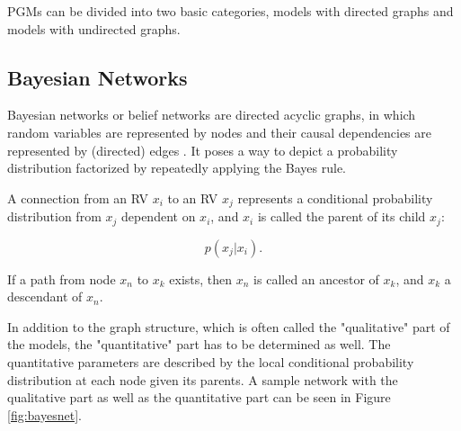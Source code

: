 PGMs can be divided into two basic categories, models with directed graphs and models with undirected graphs.


\subsection{Bayesian Networks} \label{c:bayesnet}

Bayesian networks or belief networks are directed acyclic graphs, in which random variables are represented by nodes and their causal dependencies are represented by (directed) edges \cite{Faltin2007, Goodfellow-et-al-2016-Book}. 
It poses a way to depict a probability distribution factorized by repeatedly applying the Bayes rule.

A connection from an RV $x_i$ to an RV $x_j$ represents a conditional probability distribution from $x_j$ dependent on $x_i$, and $x_i$ is called the parent of its child $x_j$:

\[
p(x_j | x_i) .
\]


If a path from node $x_n$ to $x_k$ exists, then $x_n$ is called an ancestor of $x_k$, and $x_k$ a descendant of $x_n$. 

In addition to the graph structure, which is often called the "qualitative" part of the models, the "quantitative" part has to be determined as well.
The quantitative parameters are described by the local conditional probability distribution at each node given its parents.
A sample network with the qualitative part as well as the quantitative part can be seen in Figure \ref{fig:bayesnet}. 

